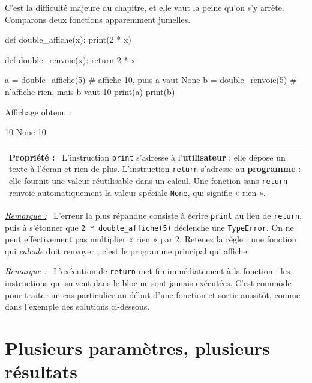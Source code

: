 \documentclass[a4paper,11pt,openany]{book}
\makeatletter
\newcommand{\code}[1]{\texttt{\textcolor{codebleu}{#1}}}
\newenvironment{cadre}%
 {\par\vspace{2mm}\noindent\begin{tabular}{|@{\hspace{4mm}}p{0.93\textwidth}@{\hspace{4mm}}|}
  \hline \\[-2mm]}%
 {\\[2mm] \hline \end{tabular}\par\vspace{3mm}}
\newcommand{\propo}[1]{\textbf{Propriété #1 :}~}
\newenvironment{remarque}%
 {\par\vspace{1mm}\begin{list}{}{\leftmargin=1cm \rightmargin=0.5cm}\item[]%
  \textit{\underline{Remarque :}}~}%
 {\end{list}\vspace{1mm}}
\makeatother
\begin{document}
C'est la difficulté majeure du chapitre, et elle vaut la peine qu'on s'y arrête. Comparons deux fonctions apparemment jumelles.

\begin{python}
def double_affiche(x):
    print(2 * x)

def double_renvoie(x):
    return 2 * x

a = double_affiche(5)     # affiche 10, puis a vaut None
b = double_renvoie(5)     # n'affiche rien, mais b vaut 10
print(a)
print(b)
\end{python}

Affichage obtenu :

\begin{sortie}
10
None
10
\end{sortie}

\begin{cadre}
\propo{} L'instruction \code{print} s'adresse à l'\textbf{utilisateur} : elle dépose un texte à l'écran et rien de plus. L'instruction \code{return} s'adresse au \textbf{programme} : elle fournit une valeur réutilisable dans un calcul. Une fonction sans \code{return} renvoie automatiquement la valeur spéciale \code{None}, qui signifie « rien ».
\end{cadre}

\begin{remarque}
L'erreur la plus répandue consiste à écrire \code{print} au lieu de \code{return}, puis à s'étonner que \code{2 * double\_affiche(5)} déclenche une \code{TypeError}. On ne peut effectivement pas multiplier « rien » par $2$. Retenez la règle : une fonction qui \emph{calcule} doit renvoyer ; c'est le programme principal qui affiche.
\end{remarque}

\begin{remarque}
L'exécution de \code{return} met fin immédiatement à la fonction : les instructions qui suivent dans le bloc ne sont jamais exécutées. C'est commode pour traiter un cas particulier au début d'une fonction et sortir aussitôt, comme dans l'exemple des solutions ci-dessous.
\end{remarque}

\section{Plusieurs paramètres, plusieurs résultats}
\end{document}
